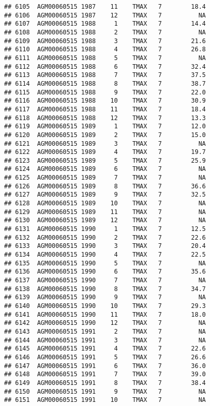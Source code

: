 \documentclass{article}\usepackage[]{graphicx}\usepackage[]{color}
\makeatletter
\newenvironment{kframe}{%
 \def\at@end@of@kframe{}%
 \ifinner\ifhmode%
  \def\at@end@of@kframe{\end{minipage}}%
  \begin{minipage}{\columnwidth}%
 \fi\fi%
 \def\FrameCommand##1{\hskip\@totalleftmargin \hskip-\fboxsep
 \colorbox{shadecolor}{##1}\hskip-\fboxsep
     \hskip-\linewidth \hskip-\@totalleftmargin \hskip\columnwidth}%
 \MakeFramed {\advance\hsize-\width
   \@totalleftmargin\z@ \linewidth\hsize
   \@setminipage}}%
 {\par\unskip\endMakeFramed%
 \at@end@of@kframe}
\newenvironment{knitrout}{}{} %
\makeatother
\begin{document}
\begin{knitrout}
\begin{kframe}
\begin{verbatim}
## 6105  AGM00060515 1987    11    TMAX   7        18.4
## 6106  AGM00060515 1987    12    TMAX   7          NA
## 6107  AGM00060515 1988     1    TMAX   7        14.4
## 6108  AGM00060515 1988     2    TMAX   7          NA
## 6109  AGM00060515 1988     3    TMAX   7        21.6
## 6110  AGM00060515 1988     4    TMAX   7        26.8
## 6111  AGM00060515 1988     5    TMAX   7          NA
## 6112  AGM00060515 1988     6    TMAX   7        32.4
## 6113  AGM00060515 1988     7    TMAX   7        37.5
## 6114  AGM00060515 1988     8    TMAX   7        38.7
## 6115  AGM00060515 1988     9    TMAX   7        22.0
## 6116  AGM00060515 1988    10    TMAX   7        30.9
## 6117  AGM00060515 1988    11    TMAX   7        18.4
## 6118  AGM00060515 1988    12    TMAX   7        13.3
## 6119  AGM00060515 1989     1    TMAX   7        12.0
## 6120  AGM00060515 1989     2    TMAX   7        15.0
## 6121  AGM00060515 1989     3    TMAX   7          NA
## 6122  AGM00060515 1989     4    TMAX   7        19.7
## 6123  AGM00060515 1989     5    TMAX   7        25.9
## 6124  AGM00060515 1989     6    TMAX   7          NA
## 6125  AGM00060515 1989     7    TMAX   7          NA
## 6126  AGM00060515 1989     8    TMAX   7        36.6
## 6127  AGM00060515 1989     9    TMAX   7        32.5
## 6128  AGM00060515 1989    10    TMAX   7          NA
## 6129  AGM00060515 1989    11    TMAX   7          NA
## 6130  AGM00060515 1989    12    TMAX   7          NA
## 6131  AGM00060515 1990     1    TMAX   7        12.5
## 6132  AGM00060515 1990     2    TMAX   7        22.6
## 6133  AGM00060515 1990     3    TMAX   7        20.4
## 6134  AGM00060515 1990     4    TMAX   7        22.5
## 6135  AGM00060515 1990     5    TMAX   7          NA
## 6136  AGM00060515 1990     6    TMAX   7        35.6
## 6137  AGM00060515 1990     7    TMAX   7          NA
## 6138  AGM00060515 1990     8    TMAX   7        34.7
## 6139  AGM00060515 1990     9    TMAX   7          NA
## 6140  AGM00060515 1990    10    TMAX   7        29.3
## 6141  AGM00060515 1990    11    TMAX   7        18.0
## 6142  AGM00060515 1990    12    TMAX   7          NA
## 6143  AGM00060515 1991     2    TMAX   7          NA
## 6144  AGM00060515 1991     3    TMAX   7          NA
## 6145  AGM00060515 1991     4    TMAX   7        22.6
## 6146  AGM00060515 1991     5    TMAX   7        26.6
## 6147  AGM00060515 1991     6    TMAX   7        36.0
## 6148  AGM00060515 1991     7    TMAX   7        39.0
## 6149  AGM00060515 1991     8    TMAX   7        38.4
## 6150  AGM00060515 1991     9    TMAX   7          NA
## 6151  AGM00060515 1991    10    TMAX   7          NA

\end{verbatim}
\end{kframe}
\end{knitrout}
\end{document}
